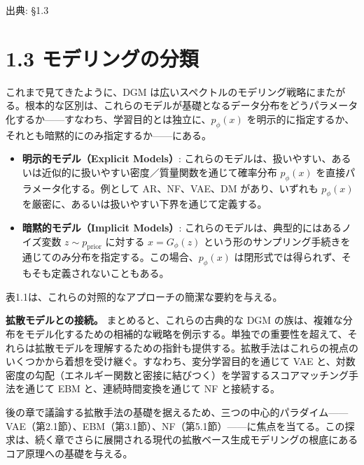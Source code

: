 

{\color{gray}\footnotesize 出典: §1.3\par}
\vspace{0.2em}

\section*{1.3 モデリングの分類}


これまで見てきたように、DGM は広いスペクトルのモデリング戦略にまたがる。根本的な区別は、これらのモデルが基礎となるデータ分布をどうパラメータ化するか——すなわち、学習目的とは独立に、$p_\phi(x)$ を明示的に指定するか、それとも暗黙的にのみ指定するか——にある。

\begin{itemize}
\item \textbf{明示的モデル（Explicit Models）}: これらのモデルは、扱いやすい、あるいは近似的に扱いやすい密度／質量関数を通じて確率分布 $p_\phi(x)$ を直接パラメータ化する。例として AR、NF、VAE、DM があり、いずれも $p_\phi(x)$ を厳密に、あるいは扱いやすい下界を通じて定義する。
\end{itemize}


\begin{itemize}
\item \textbf{暗黙的モデル（Implicit Models）}: これらのモデルは、典型的にはあるノイズ変数 $z\sim p_{\mathrm{prior}}$ に対する $x=G_\phi(z)$ という形のサンプリング手続きを通じてのみ分布を指定する。この場合、$p_\phi(x)$ は閉形式では得られず、そもそも定義されないこともある。
\end{itemize}


表1.1は、これらの対照的なアプローチの簡潔な要約を与える。



\textbf{拡散モデルとの接続。} まとめると、これらの古典的な DGM の族は、複雑な分布をモデル化するための相補的な戦略を例示する。単独での重要性を超えて、それらは拡散モデルを理解するための指針も提供する。拡散手法はこれらの視点のいくつかから着想を受け継ぐ。すなわち、変分学習目的を通じて VAE と、対数密度の勾配（エネルギー関数と密接に結びつく）を学習するスコアマッチング手法を通じて EBM と、連続時間変換を通じて NF と接続する。

後の章で議論する拡散手法の基礎を据えるため、三つの中心的パラダイム——VAE（第2.1節）、EBM（第3.1節）、NF（第5.1節）——に焦点を当てる。この探求は、続く章でさらに展開される現代の拡散ベース生成モデリングの根底にあるコア原理への基礎を与える。

